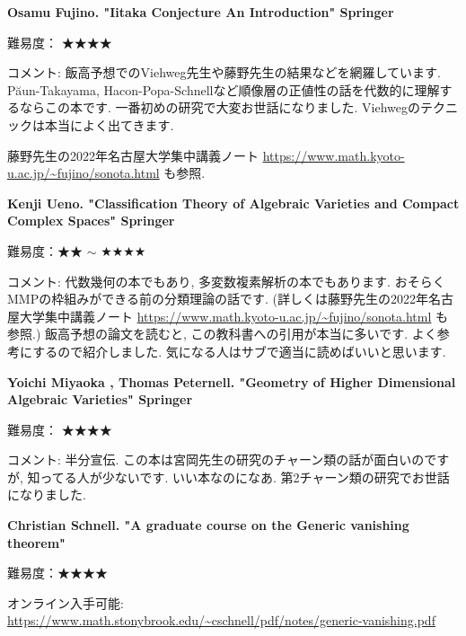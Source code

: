 \vspace{8pt}


\textbf{Osamu Fujino. "Iitaka Conjecture An Introduction" Springer} \vspace{-6pt}

難易度： ★★★★\vspace{-6pt} 

コメント: 飯高予想でのViehweg先生や藤野先生の結果などを網羅しています. P\u{a}un-Takayama, Hacon-Popa-Schnellなど順像層の正値性の話を代数的に理解するならこの本です.  
一番初めの研究で大変お世話になりました. Viehwegのテクニックは本当によく出てきます. 

藤野先生の2022年名古屋大学集中講義ノート \url{https://www.math.kyoto-u.ac.jp/~fujino/sonota.html} も参照. 
\vspace{8pt}


\textbf{Kenji Ueno. "Classification Theory of Algebraic Varieties and Compact Complex Spaces" Springer}  　\vspace{-6pt} 

難易度：★★ $\sim$ ★★★★  　\vspace{-6pt} 

コメント: 代数幾何の本でもあり, 多変数複素解析の本でもあります. おそらくMMPの枠組みができる前の分類理論の話です. (詳しくは藤野先生の2022年名古屋大学集中講義ノート \url{https://www.math.kyoto-u.ac.jp/~fujino/sonota.html} も参照.) 
飯高予想の論文を読むと, この教科書への引用が本当に多いです. 
よく参考にするので紹介しました. 気になる人はサブで適当に読めばいいと思います. 
\vspace{8pt}

\textbf{Yoichi Miyaoka , Thomas Peternell. "Geometry of Higher Dimensional Algebraic Varieties" Springer} \vspace{-6pt}

難易度： ★★★★\vspace{-6pt} 

コメント: 半分宣伝. この本は宮岡先生の研究のチャーン類の話が面白いのですが, 知ってる人が少ないです. いい本なのになあ. 第2チャーン類の研究でお世話になりました. 

\textbf{Christian Schnell. "A graduate course on the Generic vanishing theorem" }  \vspace{-6pt} 

難易度：★★★★\vspace{-6pt} 

オンライン入手可能: \url{https://www.math.stonybrook.edu/~cschnell/pdf/notes/generic-vanishing.pdf} \vspace{-6pt} 

